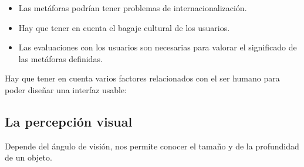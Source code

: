 \documentclass[12pt, twoside, openright]{report} %
\begin{document}
\begin{itemize}
	\item Las metáforas podrían tener problemas de internacionalización.
	\item Hay que tener en cuenta el bagaje cultural de los usuarios.
	\item Las evaluaciones con los usuarios son necesarias para valorar el
	      significado de las metáforas definidas.
\end{itemize}

Hay que tener en cuenta varios factores relacionados con el ser
humano para poder diseñar una interfaz usable:


\subsection{La percepción visual}
Depende del ángulo de visión, nos permite
conocer el tamaño y de la profundidad de un objeto.
\end{document}

